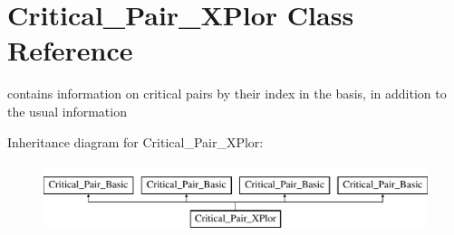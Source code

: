 \hypertarget{class_critical___pair___x_plor}{}\section{Critical\+\_\+\+Pair\+\_\+\+X\+Plor Class Reference}
\label{class_critical___pair___x_plor}


contains information on critical pairs by their index in the basis, in addition to the usual information  


Inheritance diagram for Critical\+\_\+\+Pair\+\_\+\+X\+Plor\+:\begin{figure}[H]
\begin{center}
\leavevmode
\includegraphics[height=2.000000cm]{class_critical___pair___x_plor}
\end{center}
\end{figure}
